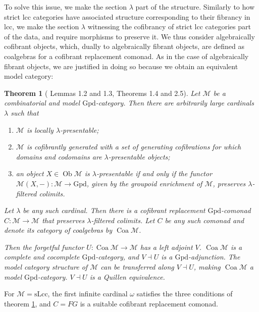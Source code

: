 \documentclass[a4paper]{article}
\newtheorem{theorem}{Theorem}
\theoremstyle{remark}
\theoremstyle{definition}
\begin{document}
To solve this issue, we make the section $\lambda$ part of the structure.
Similarly to how strict lcc categories have associated structure corresponding to their fibrancy in lcc, we make the section $\lambda$ witnessing the cofibrancy of strict lcc categories part of the data, and require morphisms to preserve it.
We thus consider algebraically cofibrant objects, which, dually to algebraically fibrant objects, are defined as coalgebras for a cofibrant replacement comonad.
As in the case of algebraically fibrant objects, we are justified in doing so because we obtain an equivalent model category:

\begin{theorem}[\cite{coalgebraic-models} Lemmas 1.2 and 1.3, Theorems 1.4 and 2.5]
  \label{th:coalgebraic-model-category}
  Let $\mathcal{M}$ be a combinatorial and model $\mathrm{Gpd}$-category.
  Then there are arbitrarily large cardinals $\lambda$ such that
  \begin{enumerate}
    \item
      $\mathcal{M}$ is locally $\lambda$-presentable;
    \item
      $\mathcal{M}$ is cofibrantly generated with a set of generating cofibrations for which domains and codomains are $\lambda$-presentable objects;
    \item
      an object $X \in \operatorname{Ob} \mathcal{M}$ is $\lambda$-presentable if and only if the functor $\mathcal{M}(X, -) : \mathcal{M} \rightarrow \mathrm{Gpd}$, given by the groupoid enrichment of $\mathcal{M}$, preserves $\lambda$-filtered colimits.
  \end{enumerate}

  Let $\lambda$ be any such cardinal.
  Then there is a cofibrant replacement $\mathrm{Gpd}$-comonad $C : \mathcal{M} \rightarrow \mathcal{M}$ that preserves $\lambda$-filtered colimits. 
  Let $C$ be any such comonad and denote its category of coalgebras by $\operatorname{Coa} \mathcal{M}$.

  Then the forgetful functor $U : \operatorname{Coa} \mathcal{M} \rightarrow \mathcal{M}$ has a left adjoint $V$.
  $\operatorname{Coa} \mathcal{M}$ is a complete and cocomplete $\mathrm{Gpd}$-category, and $V \dashv U$ is a $\mathrm{Gpd}$-adjunction.
  The model category structure of $\mathcal{M}$ can be transferred along $V \dashv U$, making $\operatorname{Coa} \mathcal{M}$ a model $\mathrm{Gpd}$-category.
  $V \dashv U$ is a Quillen equivalence.
\end{theorem}

For $\mathcal{M} = \mathrm{sLcc}$, the first infinite cardinal $\omega$ satisfies the three conditions of theorem \ref{th:coalgebraic-model-category}, and $C = FG$ is a suitable cofibrant replacement comonad.
\end{document}
